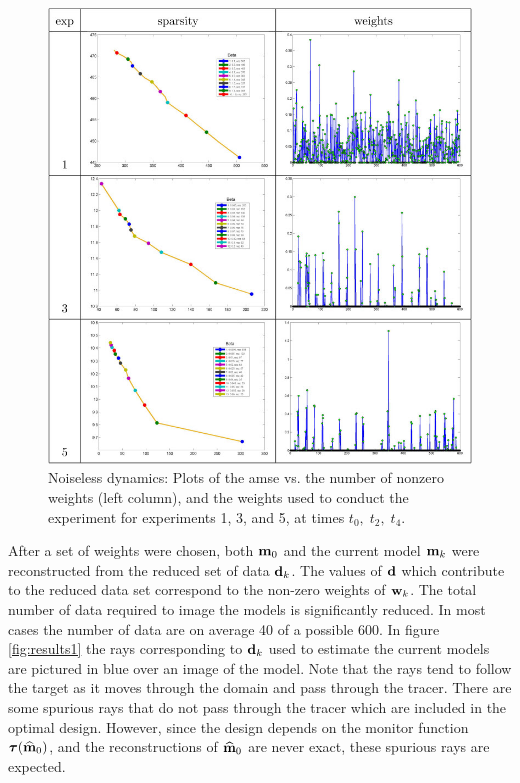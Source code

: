 \documentclass[11pt]{article}
\newcommand{\bfd}	{{\bf{d}}}
\newcommand{\bfm}	{{\bf{m}}}
\newcommand{\bfw}	{{\bf{w}}}
\newcommand{\bftau}      {{\boldsymbol \tau}}
\newcommand{\bfmhat}    {{\widehat{\bfm}}}
\begin{document}
\begin{figure}
	\renewcommand{\arraystretch}{1.5}
	\begin{center}
		\iwidth=130mm
					\includegraphics[width=1\iwidth]{figures/risk2}
	\end{center}
	\caption{Noiseless dynamics: Plots of the amse  vs. the number of nonzero weights (left column), and the weights used to conduct the experiment for experiments 1, 3, and 5, at times $t_0,\; t_2,\; t_4$.}
	\label{fig:weights1}
\end{figure}
After a set of weights were chosen, both $\bfm_0$ and the current model $\bfm_k$ were reconstructed from the reduced set of data $\bfd_k$. The values of $\bfd$ which contribute to the reduced data set correspond to the non-zero weights of $\bfw_k$. The total number of data required to image the models is significantly reduced. In most cases the number of data are on average  40 of a possible 600.
  In figure \ref{fig:results1} the rays corresponding to $\bfd_k$ used to estimate the current models are pictured in blue over an image of the model. Note that the rays tend to follow the target as it moves through the domain and pass through the tracer.
There are some spurious rays that do not pass through the tracer which are included in the optimal design. However, since the design depends on the monitor function  $\bftau(\bfmhat_0)$, and the reconstructions of $\bfmhat_0$ are never exact,  these spurious rays are expected. 
\end{document}
